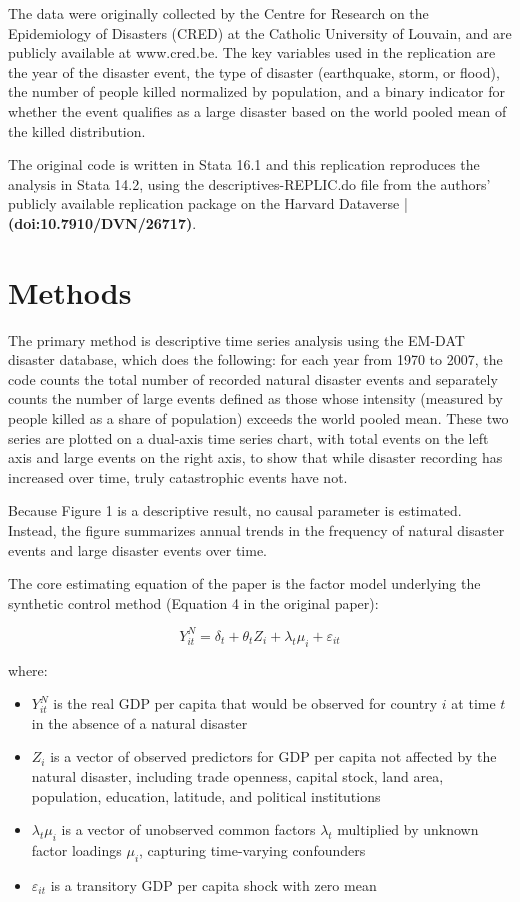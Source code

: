 \documentclass[12pt]{article}
\begin{document}
The data were originally collected by the Centre for Research on the Epidemiology of Disasters (CRED) at the Catholic University of Louvain, and are publicly available at www.cred.be. The key variables used in the replication are the year of the disaster event, the type of disaster (earthquake, storm, or flood), the number of people killed normalized by population, and a binary indicator for whether the event qualifies as a large disaster based on the world pooled mean of the killed distribution.

The original code is written in Stata 16.1 and this replication reproduces the analysis in Stata 14.2, using the descriptives-REPLIC.do file from the authors' publicly available replication package on the Harvard Dataverse |\textbf{(doi:10.7910/DVN/26717)}.

\section{Methods}

The primary method is descriptive time series analysis using the EM-DAT disaster database, which does the following: for each year from 1970 to 2007, the code counts the total number of recorded natural disaster events and separately counts the number of large events defined as those whose intensity (measured by people killed as a share of population) exceeds the world pooled mean. These two series are plotted on a dual-axis time series chart, with total events on the left axis and large events on the right axis, to show that while disaster recording has increased over time, truly catastrophic events have not.

Because Figure 1 is a descriptive result, no causal parameter is estimated. Instead, the figure summarizes annual trends in the frequency of natural disaster events and large disaster events over time.

The core estimating equation of the paper is the factor model underlying the synthetic control method (Equation 4 in the original paper):

\begin{equation}
Y^N_{it} = \delta_t + \theta_t Z_i + \lambda_t \mu_i + \varepsilon_{it}
\end{equation}

where:
\begin{itemize}
    \item $Y^N_{it}$ is the real GDP per capita that would be observed for country $i$ at time $t$ in the absence of a natural disaster
    \item $Z_i$ is a vector of observed predictors for GDP per capita not affected by the natural disaster, including trade openness, capital stock, land area, population, education, latitude, and political institutions
    \item $\lambda_t \mu_i$ is a vector of unobserved common factors $\lambda_t$ multiplied by unknown factor loadings $\mu_i$, capturing time-varying confounders
    \item $\varepsilon_{it}$ is a transitory GDP per capita shock with zero mean
\end{itemize}
\end{document}
